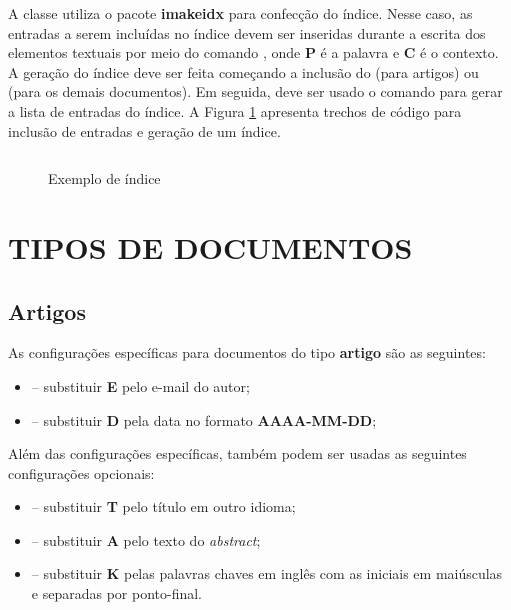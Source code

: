 \documentclass[artigo]{iftex2024}
\newcommand{\ElaboradoAutor}{Elaborado pelo autor, 2024.}
\begin{document}
A classe {\iftex} utiliza o pacote \textbf{imakeidx} para confecção do índice.
Nesse caso, as entradas a serem incluídas no índice devem ser inseridas durante a escrita dos elementos textuais por meio do comando , onde \textbf{P} é a palavra e \textbf{C} é o contexto.
A geração do índice deve ser feita começando a inclusão do  (para artigos) ou  (para os demais documentos).
Em seguida, deve ser usado o comando  para gerar a lista de entradas do índice.
A Figura \ref{fig:exemplo_indice} apresenta trechos de código para inclusão de entradas e geração de um índice.

\begin{figure}[!htb] \centering
\caption{Exemplo de índice} \label{fig:exemplo_indice}
\begin{varwidth}{\linewidth}
\inputminted{latex}{figuras/exemplo_indice.tex}
\vspace{-1em}
\legend{\ElaboradoAutor}
\end{varwidth}
\end{figure}

\section{TIPOS DE DOCUMENTOS}

\subsection{Artigos}

As configurações específicas para documentos do tipo \textbf{artigo} são as seguintes:
\begin{itemize}
  \item[]  -- substituir \textbf{E} pelo e-mail do autor;

  \item[]  -- substituir \textbf{D} pela data no formato \textbf{AAAA-MM-DD};
\end{itemize}

Além das configurações específicas, também podem ser usadas as seguintes configurações opcionais:
\begin{itemize}
  \item[]  -- substituir \textbf{T} pelo título em outro idioma;

  \item[]  -- substituir \textbf{A} pelo texto do \textit{abstract};

  \item[]  -- substituir \textbf{K} pelas palavras chaves em inglês com as iniciais em maiúsculas e separadas por ponto-final.
\end{itemize}
\end{document}
